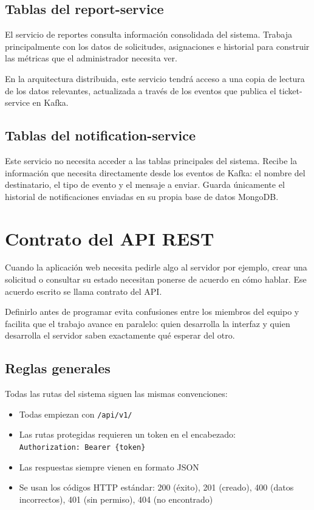 \documentclass[12pt, a4paper]{report}
\begin{document}
\section{Tablas del report-service}

El servicio de reportes consulta información consolidada del sistema.
Trabaja principalmente con los datos de solicitudes, asignaciones e
historial para construir las métricas que el administrador necesita ver.

En la arquitectura distribuida, este servicio tendrá acceso a una
copia de lectura de los datos relevantes, actualizada a través de
los eventos que publica el ticket-service en Kafka.

\section{Tablas del notification-service}

Este servicio no necesita acceder a las tablas principales del sistema.
Recibe la información que necesita directamente desde los eventos de
Kafka: el nombre del destinatario, el tipo de evento y el mensaje
a enviar. Guarda únicamente el historial de notificaciones enviadas
en su propia base de datos MongoDB.

\newpage

\chapter{Contrato del API REST}

Cuando la aplicación web necesita pedirle algo al servidor por
ejemplo, crear una solicitud o consultar su estado necesitan ponerse
de acuerdo en cómo hablar. Ese acuerdo escrito
se llama contrato del API.

Definirlo antes de programar evita confusiones entre los miembros
del equipo y facilita que el trabajo avance en paralelo: quien
desarrolla la interfaz y quien desarrolla el servidor saben
exactamente qué esperar del otro.

\section{Reglas generales}

Todas las rutas del sistema siguen las mismas convenciones:

\begin{itemize}
  \item Todas empiezan con \texttt{/api/v1/}
  \item Las rutas protegidas requieren un token en el encabezado:\\
        \texttt{Authorization: Bearer \{token\}}
  \item Las respuestas siempre vienen en formato JSON
  \item Se usan los códigos HTTP estándar: 200 (éxito), 201 (creado),
        400 (datos incorrectos), 401 (sin permiso), 404 (no encontrado)
\end{itemize}
\end{document}
